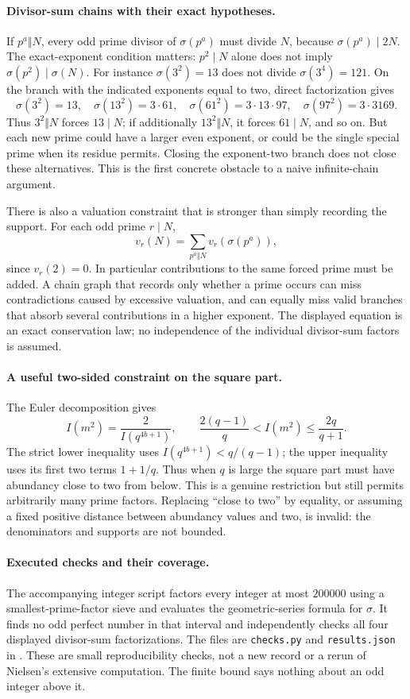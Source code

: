 \documentclass[11pt]{article}
\begin{document}
\paragraph{Divisor-sum chains with their exact hypotheses.}
If $p^a\Vert N$, every odd prime divisor of $\sigma(p^a)$ must divide
$N$, because $\sigma(p^a)\mid2N$. The exact-exponent condition matters:
$p^2\mid N$ alone does not imply $\sigma(p^2)\mid\sigma(N)$.
For instance $\sigma(3^2)=13$ does not divide $\sigma(3^4)=121$.
On the branch with the indicated exponents equal to two, direct
factorization gives
\[
 \sigma(3^2)=13,\quad \sigma(13^2)=3\cdot61,\quad
 \sigma(61^2)=3\cdot13\cdot97,\quad
 \sigma(97^2)=3\cdot3169.
\]
Thus $3^2\Vert N$ forces $13\mid N$; if additionally
$13^2\Vert N$, it forces $61\mid N$, and so on. But each new prime
could have a larger even exponent, or could be the single special prime
when its residue permits. Closing the exponent-two branch does not
close these alternatives. This is the first concrete obstacle to a
naive infinite-chain argument.

There is also a valuation constraint that is stronger than simply
recording the support. For each odd prime $r\mid N$,
\[
 v_r(N)=\sum_{p^a\Vert N}v_r(\sigma(p^a)),
\]
since $v_r(2)=0$. In particular contributions to the same forced prime
must be added. A chain graph that records only whether a prime occurs
can miss contradictions caused by excessive valuation, and can equally
miss valid branches that absorb several contributions in a higher
exponent. The displayed equation is an exact conservation law; no
independence of the individual divisor-sum factors is assumed.

\paragraph{A useful two-sided constraint on the square part.}
The Euler decomposition gives
\[
 I(m^2)=\frac2{I(q^{4b+1})},\qquad
 \frac{2(q-1)}q<I(m^2)\le\frac{2q}{q+1}.
\]
The strict lower inequality uses $I(q^{4b+1})<q/(q-1)$;
the upper inequality uses its first two terms $1+1/q$.
Thus when $q$ is large the square part must have abundancy close to two
from below. This is a genuine restriction but still permits arbitrarily
many prime factors. Replacing ``close to two'' by equality, or assuming
a fixed positive distance between abundancy values and two, is invalid:
the denominators and supports are not bounded.

\paragraph{Executed checks and their coverage.}
The accompanying integer script factors every integer at most $200000$
using a smallest-prime-factor sieve and evaluates the geometric-series
formula for $\sigma$. It finds no odd perfect number in that interval
and independently checks all four displayed divisor-sum factorizations.
The files are \texttt{checks.py} and \texttt{results.json} in
.
These are small reproducibility checks, not a new record or a rerun of
Nielsen's extensive computation. The finite bound says nothing about
an odd integer above it.
\end{document}
